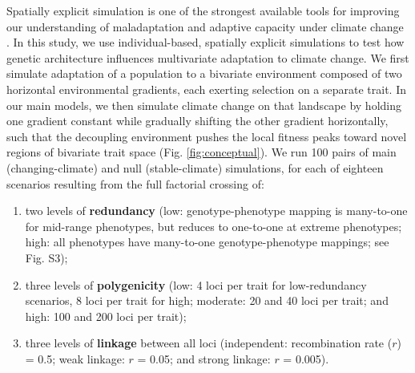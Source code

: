 \documentclass[9pt,twocolumn,twoside,lineno]{pnas-new}
\begin{document}
Spatially explicit simulation is one of the strongest available tools
for improving our understanding of maladaptation and adaptive capacity
under climate change \cite{capblancq_review}.
In this study, we use individual-based, spatially explicit simulations
to test how genetic architecture influences multivariate adaptation to climate change.
We first simulate 
adaptation of a population to a bivariate environment composed of two horizontal 
environmental gradients, each exerting selection on a separate trait.
In our main models, we then simulate climate change on that landscape by holding one gradient 
constant while gradually shifting the other gradient horizontally, such that
the decoupling environment pushes the local fitness peaks toward novel regions 
of bivariate trait space (Fig. \ref{fig:conceptual}).
We run 100 pairs of main (changing-climate)
and null (stable-climate) simulations, for each of eighteen scenarios
resulting from the full factorial crossing of:
\begin{enumerate}
    \item two levels of \textbf{redundancy} (low: genotype-phenotype mapping is many-to-one for mid-range phenotypes, but reduces to one-to-one at extreme phenotypes; high: all phenotypes have many-to-one genotype-phenotype mappings; see Fig. S3); 
    \item three levels of \textbf{polygenicity} (low: 4 loci per trait for low-redundancy scenarios, 8 loci per trait for high; moderate: 20 and 40 loci per trait; and high: 100 and 200 loci per trait);
    \item three levels of \textbf{linkage} between all loci (independent: recombination rate ($r$) = 0.5; weak linkage: $r$ = 0.05; and strong linkage: $r$ = 0.005).
\end{enumerate}
\end{document}
